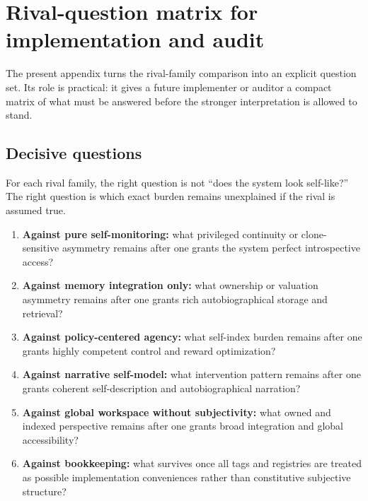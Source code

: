 \documentclass[11pt,a4paper]{article}
\theoremstyle{definition}
\begin{document}
\section{Rival-question matrix for implementation and audit}
The present appendix turns the rival-family comparison into an explicit question set. Its role is practical: it gives a future implementer or auditor a compact matrix of what must be answered before the stronger interpretation is allowed to stand.

\subsection{Decisive questions}
For each rival family, the right question is not ``does the system look self-like?'' The right question is which exact burden remains unexplained if the rival is assumed true.

\begin{enumerate}[leftmargin=1.5em]
\item \textbf{Against pure self-monitoring:} what privileged continuity or clone-sensitive asymmetry remains after one grants the system perfect introspective access?
\item \textbf{Against memory integration only:} what ownership or valuation asymmetry remains after one grants rich auto\-bio\-graphical storage and retrieval?
\item \textbf{Against policy-centered agency:} what self-index burden remains after one grants highly competent control and reward optimization?
\item \textbf{Against narrative self-model:} what intervention pattern remains after one grants coherent self-description and auto\-bio\-graphical narration?
\item \textbf{Against global workspace without subjectivity:} what owned and indexed perspective remains after one grants broad integration and global accessibility?
\item \textbf{Against bookkeeping:} what survives once all tags and registries are treated as possible implementation conveniences rather than constitutive subjective structure?
\end{enumerate}
\end{document}
